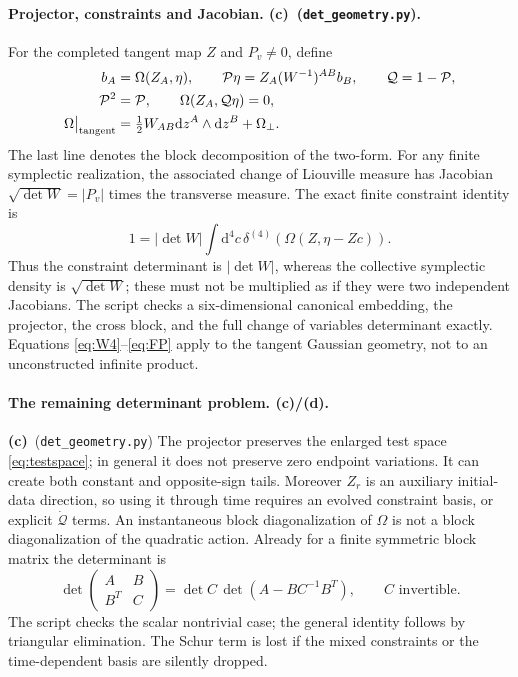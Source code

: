 \documentclass[11pt,a4paper]{article}
\newcommand{\Lc}{\textbf{(c)}}
\newcommand{\Ld}{\textbf{(d)}}
\newcommand{\G}{\texttt{det\_geometry.py}}
\newcommand{\dd}{\mathrm d}
\begin{document}
\paragraph{Projector, constraints and Jacobian. \Lc\ (\G).}
For the completed tangent map $Z$ and $P_v\ne0$, define
\begin{align}
 b_A&=\Omega(Z_A,\eta),\qquad
 \mathcal P\eta=Z_A(W^{-1})^{AB}b_B,\qquad \mathcal Q=1-\mathcal P,\\
 \mathcal P^2&=\mathcal P,\qquad \Omega(Z_A,\mathcal Q\eta)=0,\\
 \Omega\big|_{\rm tangent}&=\tfrac12W_{AB}\dd z^A\wedge\dd z^B+\Omega_\perp.
\end{align}
The last line denotes the block decomposition of the two-form.
For any finite symplectic realization, the associated
change of Liouville measure has Jacobian $\sqrt{\det W}=|P_v|$ times the
transverse measure. The exact finite constraint identity is
\begin{equation}
 1=|\det W|\int\dd^4c\,
       \delta^{(4)}\!\left(\Omega(Z,\eta-Zc)\right).\label{eq:FP}
\end{equation}
Thus the constraint determinant is $|\det W|$, whereas the collective
symplectic density is $\sqrt{\det W}$; these must not be multiplied as if
they were two independent Jacobians. The script checks a six-dimensional
canonical embedding, the projector, the cross block, and the full change of
variables determinant exactly. Equations \eqref{eq:W4}--\eqref{eq:FP} apply
to the tangent Gaussian geometry, not to an unconstructed infinite product.

\paragraph{The remaining determinant problem. \Lc/\Ld.}
\Lc\ (\G) The projector preserves the enlarged test space
\eqref{eq:testspace}; in general it does not preserve zero endpoint
variations. It can create both constant and opposite-sign tails. Moreover
$Z_r$ is an auxiliary initial-data direction, so using it through time requires
an evolved constraint basis, or explicit $\dot{\mathcal Q}$ terms. An
instantaneous block diagonalization of $\Omega$ is not a block
diagonalization of the quadratic action. Already for a finite symmetric block
matrix the determinant is
\begin{equation}
 \det\begin{pmatrix}A&B\\B^T&C\end{pmatrix}
 =\det C\,\det(A-BC^{-1}B^T),\qquad C\text{ invertible}.\label{eq:schur}
\end{equation}
The script checks the scalar nontrivial case; the general identity follows
by triangular elimination. The Schur term is lost if the mixed constraints
or the time-dependent basis are silently dropped.
\end{document}

